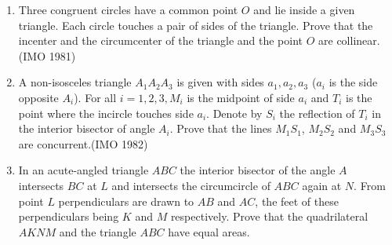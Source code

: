 \begin{enumerate}[label=\thesubsection.\arabic*,ref=\thesubsection.\theenumi]
\item Three congruent circles have a common point $O$ and lie inside     a given triangle. Each circle touches a pair of sides of the triangle. Prove that the incenter and the circumcenter of the triangle and   the point $O$  are collinear. \hfill(IMO  1981)     
\item A non-isosceles triangle $A_1 A_2 A_3$ is given with sides $a_1,a_2,a_3$ ($a_i$ is the side opposite $A_i$). For all $i = 1, 2, 3, M_i$ is the midpoint of side $a_i$ and $T_i$ is the point where     the incircle touches side $a_i$. Denote by $S_i$ the reflection of $T_i$ in the interior bisector of angle $A_i$. Prove that the lines $M_1S_1$, $ M_2S_2$ and $M_3S_3$ are concurrent.\hfill(IMO  1982)
    \item In an acute-angled triangle $ABC$ the interior bisector of the angle $A$ intersects $BC$ at $L$ and intersects the circumcircle of $ABC$ again at $N$. From point $L$ perpendiculars are drawn to $AB$ and $AC$, the feet of these perpendiculars being $K$ and $M$ respectively. Prove that the quadrilateral $AKNM$ and the triangle $ABC$ have equal areas.


\end{enumerate}
